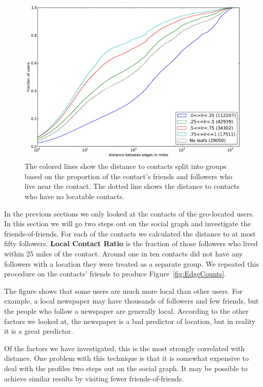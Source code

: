 \begin{figure}[tb]
\centering
\includegraphics[width=\linewidth]{figures/locals_10.pdf}
\caption{
The colored lines show the distance to contacts split into groups based on the
proportion of the contact's friends and followers who live near the contact.
The dotted line shows the distance to contacts who have no locatable contacts.
}
\label{fig:Local10}
\end{figure}

In the previous sections we only looked at the contacts of the geo-located
users. In this section we will go two steps out on the social graph and
investigate the friends-of-friends.
%
For each of the contacts we calculated the distance to at most fifty followers.
%
\textbf{Local Contact Ratio} is the fraction of those followers who lived within 25 miles
of the contact.
%
Around one in ten contacts did not have any followers with a location they were
treated as a separate group.
%
We repeated this procedure on the contacts' friends to produce
Figure~\ref{fig:EdgeCounts}.

The figure shows that some users are much more local than other users.
For example, a local newspaper may have thousands of followers and few friends,
but the people who follow a newspaper are generally local.
According to the other factors we looked at, the newspaper is a bad predictor
of location, but in reality it is a great predictor.

Of the factors we have investigated, this is the most strongly correlated with
distance.
One problem with this technique is that it is somewhat expensive to deal with
the profiles two steps out on the social graph.
It may be possible to achieve similar results by visiting fewer
friends-of-friends.

